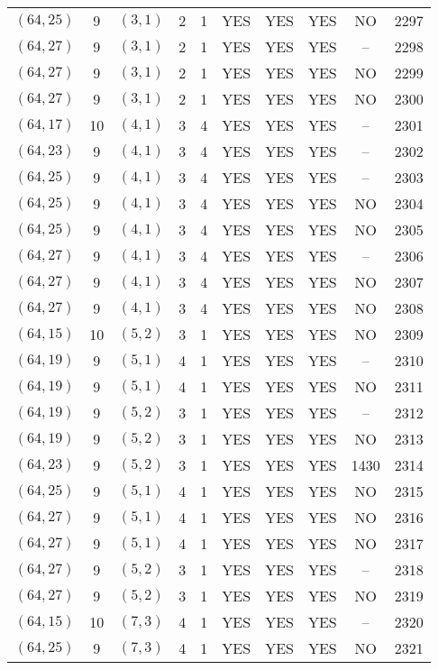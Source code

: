 \begin{longtable}{|c|c|c|c|c|c|c|c|c|c|}
$(64, 25)$ & 9 & $(3, 1)$ & 2 & 1 & YES & YES & YES & NO & 2297\\
$(64, 27)$ & 9 & $(3, 1)$ & 2 & 1 & YES & YES & YES & -- & 2298\\
$(64, 27)$ & 9 & $(3, 1)$ & 2 & 1 & YES & YES & YES & NO & 2299\\
$(64, 27)$ & 9 & $(3, 1)$ & 2 & 1 & YES & YES & YES & NO & 2300\\
$(64, 17)$ & 10 & $(4, 1)$ & 3 & 4 & YES & YES & YES & -- & 2301\\
$(64, 23)$ & 9 & $(4, 1)$ & 3 & 4 & YES & YES & YES & -- & 2302\\
$(64, 25)$ & 9 & $(4, 1)$ & 3 & 4 & YES & YES & YES & -- & 2303\\
$(64, 25)$ & 9 & $(4, 1)$ & 3 & 4 & YES & YES & YES & NO & 2304\\
$(64, 25)$ & 9 & $(4, 1)$ & 3 & 4 & YES & YES & YES & NO & 2305\\
$(64, 27)$ & 9 & $(4, 1)$ & 3 & 4 & YES & YES & YES & -- & 2306\\
$(64, 27)$ & 9 & $(4, 1)$ & 3 & 4 & YES & YES & YES & NO & 2307\\
$(64, 27)$ & 9 & $(4, 1)$ & 3 & 4 & YES & YES & YES & NO & 2308\\
$(64, 15)$ & 10 & $(5, 2)$ & 3 & 1 & YES & YES & YES & NO & 2309\\
$(64, 19)$ & 9 & $(5, 1)$ & 4 & 1 & YES & YES & YES & -- & 2310\\
$(64, 19)$ & 9 & $(5, 1)$ & 4 & 1 & YES & YES & YES & NO & 2311\\
$(64, 19)$ & 9 & $(5, 2)$ & 3 & 1 & YES & YES & YES & -- & 2312\\
$(64, 19)$ & 9 & $(5, 2)$ & 3 & 1 & YES & YES & YES & NO & 2313\\
$(64, 23)$ & 9 & $(5, 2)$ & 3 & 1 & YES & YES & YES & 1430 & 2314\\
$(64, 25)$ & 9 & $(5, 1)$ & 4 & 1 & YES & YES & YES & NO & 2315\\
$(64, 27)$ & 9 & $(5, 1)$ & 4 & 1 & YES & YES & YES & NO & 2316\\
$(64, 27)$ & 9 & $(5, 1)$ & 4 & 1 & YES & YES & YES & NO & 2317\\
$(64, 27)$ & 9 & $(5, 2)$ & 3 & 1 & YES & YES & YES & -- & 2318\\
$(64, 27)$ & 9 & $(5, 2)$ & 3 & 1 & YES & YES & YES & NO & 2319\\
$(64, 15)$ & 10 & $(7, 3)$ & 4 & 1 & YES & YES & YES & -- & 2320\\
$(64, 25)$ & 9 & $(7, 3)$ & 4 & 1 & YES & YES & YES & NO & 2321\\

\end{longtable}
